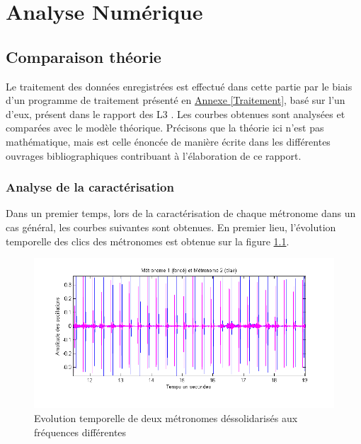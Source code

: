 \documentclass[a4paper,11pt]{report}
\begin{document}
\chapter{Analyse Numérique}
\section{Comparaison théorie}
Le traitement des données enregistrées est effectué dans cette partie par le biais d'un programme de traitement présenté en \underline{Annexe \ref{Traitement}}, basé sur l'un d'eux, présent dans le rapport des L3 \cite{ram}. Les courbes obtenues sont analysées et comparées avec le modèle théorique. Précisons que la théorie ici n'est pas mathématique, mais est celle énoncée de manière écrite dans les différentes ouvrages bibliographiques contribuant à l'élaboration de ce rapport.

\subsection{Analyse de la caractérisation}
Dans un premier temps, lors de la caractérisation de chaque métronome dans un cas général, les courbes suivantes sont obtenues. En premier lieu, l'évolution temporelle des clics des métronomes est obtenue sur la figure \ref{CaractérisationT}.
\begin{figure}[h]
\centering
\includegraphics[width=1\textwidth]{Caracterisation_temporelle_200BPM}
\caption{Evolution temporelle de deux métronomes déssolidarisés aux fréquences différentes}\label{CaractérisationT}
\end{figure}\\
\end{document}
